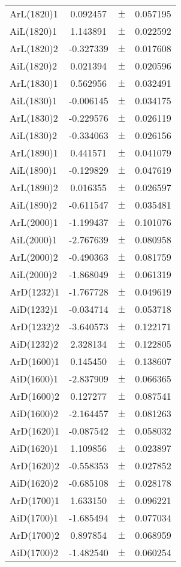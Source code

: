\begin{table}
\begin{tiny}
\begin{tabular}{lccc}
ArL(1820)1 & 0.092457 & $\pm$ & 0.057195 \\
AiL(1820)1 & 1.143891 & $\pm$ & 0.022592 \\
ArL(1820)2 & -0.327339 & $\pm$ & 0.017608 \\
AiL(1820)2 & 0.021394 & $\pm$ & 0.020596 \\
ArL(1830)1 & 0.562956 & $\pm$ & 0.032491 \\
AiL(1830)1 & -0.006145 & $\pm$ & 0.034175 \\
ArL(1830)2 & -0.229576 & $\pm$ & 0.026119 \\
AiL(1830)2 & -0.334063 & $\pm$ & 0.026156 \\
ArL(1890)1 & 0.441571 & $\pm$ & 0.041079 \\
AiL(1890)1 & -0.129829 & $\pm$ & 0.047619 \\
ArL(1890)2 & 0.016355 & $\pm$ & 0.026597 \\
AiL(1890)2 & -0.611547 & $\pm$ & 0.035481 \\
ArL(2000)1 & -1.199437 & $\pm$ & 0.101076 \\
AiL(2000)1 & -2.767639 & $\pm$ & 0.080958 \\
ArL(2000)2 & -0.490363 & $\pm$ & 0.081759 \\
AiL(2000)2 & -1.868049 & $\pm$ & 0.061319 \\
ArD(1232)1 & -1.767728 & $\pm$ & 0.049619 \\
AiD(1232)1 & -0.034714 & $\pm$ & 0.053718 \\
ArD(1232)2 & -3.640573 & $\pm$ & 0.122171 \\
AiD(1232)2 & 2.328134 & $\pm$ & 0.122805 \\
ArD(1600)1 & 0.145450 & $\pm$ & 0.138607 \\
AiD(1600)1 & -2.837909 & $\pm$ & 0.066365 \\
ArD(1600)2 & 0.127277 & $\pm$ & 0.087541 \\
AiD(1600)2 & -2.164457 & $\pm$ & 0.081263 \\
ArD(1620)1 & -0.087542 & $\pm$ & 0.058032 \\
AiD(1620)1 & 1.109856 & $\pm$ & 0.023897 \\
ArD(1620)2 & -0.558353 & $\pm$ & 0.027852 \\
AiD(1620)2 & -0.685108 & $\pm$ & 0.028178 \\
ArD(1700)1 & 1.633150 & $\pm$ & 0.096221 \\
AiD(1700)1 & -1.685494 & $\pm$ & 0.077034 \\
ArD(1700)2 & 0.897854 & $\pm$ & 0.068959 \\
AiD(1700)2 & -1.482540 & $\pm$ & 0.060254 \\
\bottomrule
\end{tabular}
\end{tiny}
\end{table}

